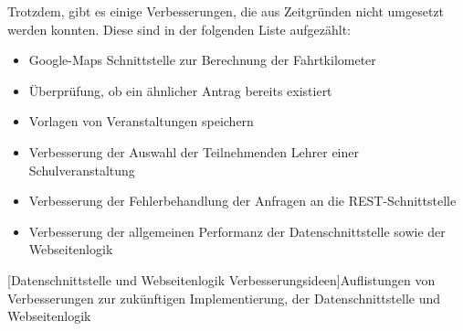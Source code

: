 Trotzdem, gibt es einige Verbesserungen, die aus Zeitgründen nicht umgesetzt werden konnten. Diese sind in der folgenden Liste aufgezählt:
\begin{itemize}
	\item Google-Maps Schnittstelle zur Berechnung der Fahrtkilometer
	\item Überprüfung, ob ein ähnlicher Antrag bereits existiert
	\item Vorlagen von Veranstaltungen speichern
	\item Verbesserung der Auswahl der Teilnehmenden Lehrer einer Schulveranstaltung
	\item Verbesserung der Fehlerbehandlung der Anfragen an die REST-Schnittstelle
	\item Verbesserung der allgemeinen Performanz der Datenschnittstelle sowie der Webseitenlogik
\end{itemize}
[Datenschnittstelle und Webseitenlogik Verbesserungsideen]{Auflistungen von Verbesserungen zur zukünftigen Implementierung, der Datenschnittstelle und Webseitenlogik}